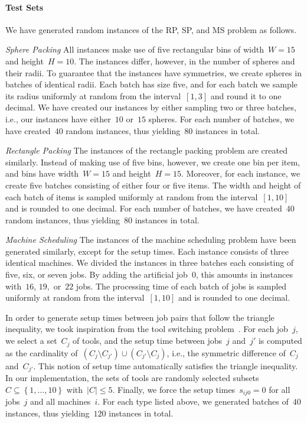 \documentclass[a4paper,10pt]{article}
\newcommand{\rectanglepack}{RP\xspace}
\newcommand{\spherepack}{SP\xspace}
\newcommand{\scheduling}{MS\xspace}
\newcommand{\brackets}[1]{\left\{ #1 \right\}}
\theoremstyle{definition}
\begin{document}
\paragraph{Test Sets}
We have generated random instances of the \rectanglepack, \spherepack, and \scheduling problem as follows.

\medskip
\noindent\emph{Sphere Packing}
All instances make use of five rectangular bins of width~$W = 15$ and height~$H = 10$.
The instances differ, however, in the number of spheres and their radii.
To guarantee that the instances have symmetries, we create spheres in batches of identical radii.
Each batch has size five, and for each batch we sample its radius uniformly at random from the interval~$[1,3]$ and round it to one decimal.
We have created our instances by either sampling two or three batches, i.e., our instances have either~$10$ or~$15$ spheres.
For each number of batches, we have created~$40$ random instances, thus yielding~$80$ instances in total.

\medskip
\noindent\emph{Rectangle Packing}
The instances of the rectangle packing problem are created similarly.
Instead of making use of five bins, however, we create one bin per item, and bins have width~$W = 15$ and height~$H = 15$.
Moreover, for each instance, we create five batches consisting of either four or five items.
The width and height of each batch of items is sampled uniformly at random from the interval~$[1,10]$ and is rounded to one decimal.
For each number of batches, we have created~$40$ random instances, thus yielding~$80$ instances in total.

\medskip
\noindent\emph{Machine Scheduling}
The instances of the machine scheduling problem have been generated similarly, except for the setup times.
Each instance consists of three identical machines.
We divided the instances in three batches each consisting of five, six, or seven jobs.
By adding the artificial job~$0$, this amounts in instances with~$16$, $19,$ or~$22$ jobs.
The processing time of each batch of jobs is sampled uniformly at random from the interval~$[1, 10]$ and is rounded to one decimal.

In order to generate setup times between job pairs that follow the triangle inequality, we took inspiration from the tool switching problem~\cite{tang1988models}.
For each job~$j$, we select a set~$C_j$ of tools, and the setup time between jobs~$j$ and~$j'$ is computed as the cardinality of~$(C_j \setminus C_{j'}) \cup (C_{j'} \setminus C_j)$, i.e., the symmetric difference of~$C_j$ and~$C_{j'}$.
This notion of setup time automatically satisfies the triangle inequality.
In our implementation, the sets of tools are randomly selected subsets~$C\subseteq\brackets{1, \dots, 10}$ with~$|C|\leq 5$.
Finally, we force the setup times~$s_{ij0} = 0$ for all jobs~$j$ and all machines~$i$. 
For each type listed above, we generated batches of~$40$ instances, thus yielding~$120$ instances in total.
\end{document}
